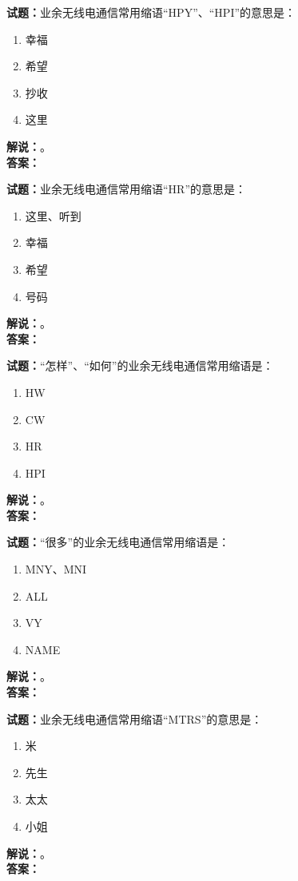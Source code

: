 \documentclass{ctexbook}
\begin{document}
\bigskip

\noindent\textbf{试题：}业余无线电通信常用缩语“HPY”、“HPI”的意思是：
\begin{enumerate}[leftmargin=3em]
  \item 幸福
  \item 希望
  \item 抄收
  \item 这里
\end{enumerate}
\noindent\textbf{解说：}\textbf{}。\\\noindent\textbf{答案：}

\bigskip

\noindent\textbf{试题：}业余无线电通信常用缩语“HR”的意思是：
\begin{enumerate}[leftmargin=3em]
  \item 这里、听到
  \item 幸福
  \item 希望
  \item 号码
\end{enumerate}
\noindent\textbf{解说：}\textbf{}。\\\noindent\textbf{答案：}

\bigskip

\noindent\textbf{试题：}“怎样”、“如何”的业余无线电通信常用缩语是：
\begin{enumerate}[leftmargin=3em]
  \item HW
  \item CW
  \item HR
  \item HPI
\end{enumerate}
\noindent\textbf{解说：}\textbf{}。\\\noindent\textbf{答案：}

\bigskip

\noindent\textbf{试题：}“很多”的业余无线电通信常用缩语是：
\begin{enumerate}[leftmargin=3em]
  \item MNY、MNI
  \item ALL
  \item VY
  \item NAME
\end{enumerate}
\noindent\textbf{解说：}\textbf{}。\\\noindent\textbf{答案：}

\bigskip

\noindent\textbf{试题：}业余无线电通信常用缩语“MTRS”的意思是：
\begin{enumerate}[leftmargin=3em]
  \item 米
  \item 先生
  \item 太太
  \item 小姐
\end{enumerate}
\noindent\textbf{解说：}\textbf{}。\\\noindent\textbf{答案：}
\end{document}
